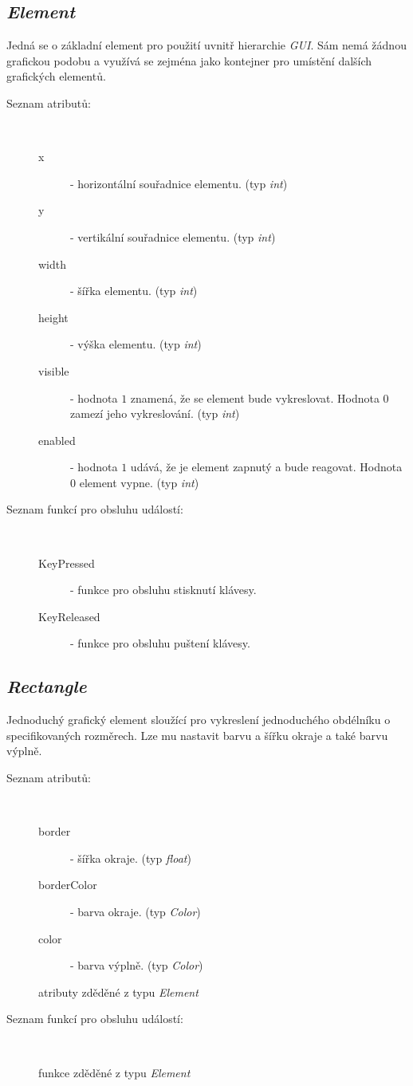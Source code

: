 \documentclass[11pt,twoside,a4paper]{book}
\begin{document}
\subsection{\textit{Element}}
Jedná se o základní element pro použití uvnitř hierarchie \textit{GUI}. Sám nemá žádnou grafickou podobu a využívá se zejména jako kontejner pro umístění dalších grafických elementů.\\
\begin{description}
\item[Seznam atributů:] ~
\begin{description}
\item[x] - horizontální souřadnice elementu. (typ \textit{int})
\item[y] - vertikální souřadnice elementu. (typ \textit{int})
\item[width] - šířka elementu. (typ \textit{int})
\item[height] - výška elementu. (typ \textit{int})
\item[visible] - hodnota $1$ znamená, že se element bude vykreslovat. Hodnota $0$ zamezí jeho vykreslování. (typ \textit{int})
\item[enabled] - hodnota $1$ udává, že je element zapnutý a bude reagovat. Hodnota $0$ element vypne. (typ \textit{int})
\end{description}
\item[Seznam funkcí pro obsluhu událostí:] ~
\begin{description}
\item[KeyPressed] - funkce pro obsluhu stisknutí klávesy.
\item[KeyReleased] - funkce pro obsluhu puštení klávesy.
\end{description}
\end{description}


\subsection{\textit{Rectangle}}
Jednoduchý grafický element sloužící pro vykreslení jednoduchého obdélníku o specifikovaných rozměrech. Lze mu nastavit barvu a šířku okraje a také barvu výplně.\\
\begin{description}
\item[Seznam atributů:] ~
\begin{description}
\item[border] - šířka okraje. (typ \textit{float})
\item[borderColor] - barva okraje. (typ \textit{Color})
\item[color] - barva výplně. (typ \textit{Color})
\item[atributy zděděné z typu \textit{Element}]
\end{description}
\item[Seznam funkcí pro obsluhu událostí:] ~
\begin{description}
\item[funkce zděděné z typu \textit{Element}]
\end{description}
\end{description}
\end{document}
